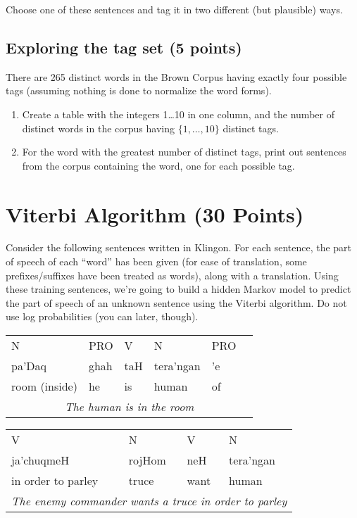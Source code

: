 \documentclass[11pt]{article}
\begin{document}
Choose one of these sentences and tag it in
two different (but plausible) ways.


\subsection{Exploring the tag set (5 points)}
There are 265 distinct words in the Brown Corpus having exactly four possible tags (assuming nothing is done to normalize the word forms).
\begin{enumerate}
\item Create a table with the integers 1\dots 10 in one column, and the number of distinct
words in the corpus having $\{1, \dots, 10\}$ distinct tags.
\item For the word with the greatest number of distinct tags, print out sentences from
the corpus containing the word, one for each possible tag.

\end{enumerate}

\section{Viterbi Algorithm (30 Points)}

Consider the following sentences written in Klingon.  For each
sentence, the part of speech of each ``word'' has been given (for ease
of translation, some prefixes/suffixes have been treated as words),
along with a translation.  Using these training sentences, we're going
to build a hidden Markov model to predict the part of speech of an
unknown sentence using the Viterbi algorithm.  Do not use log probabilities (you can later, though).

\begin{tabular}{llllll}
  N  & PRO  & V   & N         & PRO  \\
pa'Daq   & ghah & taH & tera'ngan & 'e   \\
room (inside)    & he   & is  & human     & of   \\
\multicolumn{6}{c}{{\em The human is in the room}} \\
\end{tabular}

\begin{tabular}{llll}
V   & N      & V    & N              \\
ja'chuqmeH & rojHom & neH  & tera'ngan        \\
in order to parley  & truce  & want & human \\
\multicolumn{4}{c}{{\em The enemy commander wants a truce in order to parley}}
\end{tabular}
\end{document}
